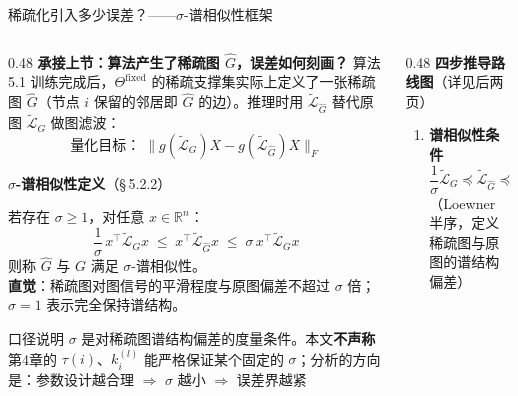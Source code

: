 \documentclass[aspectratio=169,9pt,xcolor=dvipsnames]{beamer}
\newcommand{\highlight}[1]{\textcolor{myred}{\textbf{#1}}}
\newcommand{\blue}[1]{\textcolor{mynavy}{#1}}
\begin{document}
\begin{frame}{稀疏化引入多少误差？——$\sigma$-谱相似性框架}
\begin{columns}[T]

\begin{column}{0.48\textwidth}
  \textbf{\highlight{承接上节：算法产生了稀疏图 $\hat{G}$，误差如何刻画？}}
  算法 5.1 训练完成后，$\Theta^{\mathrm{fixed}}$ 的稀疏支撑集实际上定义了一张稀疏图 $\hat{G}$（节点 $i$ 保留的邻居即 $\hat{G}$ 的边）。推理时用 $\tilde{\mathcal{L}}_{\hat{G}}$ 替代原图 $\tilde{\mathcal{L}}_G$ 做图滤波：
  \begin{equation*}
    \text{量化目标：}\;
    \bigl\|g(\tilde{\mathcal{L}}_G)X - g(\tilde{\mathcal{L}}_{\hat{G}})X\bigr\|_F
  \end{equation*}

  \textbf{\blue{$\sigma$-谱相似性定义}}（§\,5.2.2）

  若存在 $\sigma\ge 1$，对任意 $x\in\mathbb{R}^n$：
  \begin{equation*}
    \frac{1}{\sigma}\,x^\top\tilde{\mathcal{L}}_G x
    \;\leq\;
    x^\top\tilde{\mathcal{L}}_{\hat{G}}x
    \;\leq\;
    \sigma\,x^\top\tilde{\mathcal{L}}_G x
  \end{equation*}
  则称 $\hat{G}$ 与 $G$ 满足 $\sigma$-谱相似性。\\
  \textbf{直觉}：稀疏图对图信号的平滑程度与原图偏差不超过 $\sigma$ 倍；$\sigma=1$ 表示完全保持谱结构。

  \begin{alertblock}{口径说明}
     $\sigma$ 是对稀疏图谱结构偏差的度量条件。本文\textbf{不声称}第4章的 $\tau(i)$、$k_i^{(l)}$ 能严格保证某个固定的 $\sigma$；分析的方向是：参数设计越合理 $\Rightarrow$ $\sigma$ 越小 $\Rightarrow$ 误差界越紧
  \end{alertblock}
\end{column}

\begin{column}{0.48\textwidth}
  \textbf{\blue{四步推导路线图}}（详见后两页）

  \vspace{0.15cm}
  \begin{enumerate}\setlength{\itemsep}{10pt}
    \item \textbf{谱相似性条件}\\
      $\dfrac{1}{\sigma}\tilde{\mathcal{L}}_G\preceq\tilde{\mathcal{L}}_{\hat{G}}\preceq\sigma\tilde{\mathcal{L}}_G$\\
       （Loewner 半序，定义稀疏图与原图的谱结构偏差）


\end{enumerate}
\end{column}
\end{columns}
\end{frame}
\end{document}
